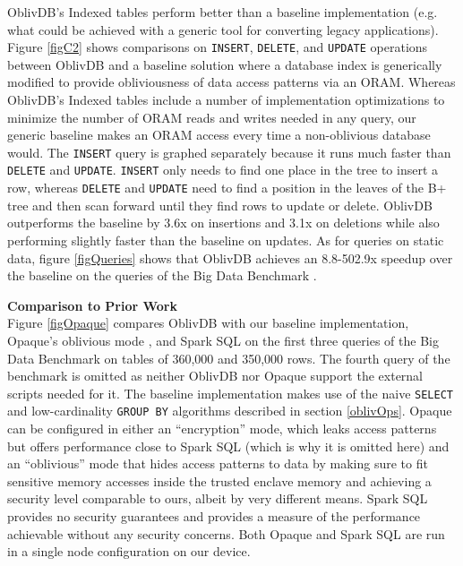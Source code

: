 \documentclass[conference]{IEEEtran}
\def\name/{OblivDB}
\begin{document}
\name/'s Indexed tables perform better than a baseline implementation (e.g. what could be achieved with a generic tool for converting legacy applications). Figure \ref{figC2} shows comparisons on \texttt{INSERT}, \texttt{DELETE}, and \texttt{UPDATE} operations between \name/ and a baseline solution where a database index is generically modified to provide obliviousness of data access patterns via an ORAM. Whereas \name/'s Indexed tables include a number of implementation optimizations to minimize the number of ORAM reads and writes needed in any query, our generic baseline makes an ORAM access every time a non-oblivious database would. The \texttt{INSERT} query is graphed separately because it runs much faster than \texttt{DELETE} and \texttt{UPDATE}. \texttt{INSERT} only needs to find one place in the tree to insert a row, whereas \texttt{DELETE} and \texttt{UPDATE} need to find a position in the leaves of the B+ tree and then scan forward until they find rows to update or delete. \name/ outperforms the baseline by 3.6x on insertions and 3.1x on deletions while also performing slightly faster than the baseline on updates. As for queries on static data, figure \ref{figQueries} shows that \name/ achieves an 8.8-502.9x speedup over the baseline on the queries of the Big Data Benchmark \cite{BDB}.

\medskip \noindent \textbf{Comparison to Prior Work}\\

Figure \ref{figOpaque} compares \name/ with our baseline implementation, Opaque's oblivious mode \cite{ZDB+17}, and Spark SQL \cite{SparkSQL} on the first three queries of the Big Data Benchmark \cite{BDB} on tables of 360,000 and 350,000 rows. The fourth query of the benchmark is omitted as neither \name/ nor Opaque support the external scripts needed for it. The baseline implementation makes use of the naive \texttt{SELECT} and low-cardinality \texttt{GROUP BY} algorithms described in section \ref{oblivOps}. Opaque can be configured in either an ``encryption'' mode, which leaks access patterns but offers performance close to Spark SQL (which is why it is omitted here) and an ``oblivious'' mode that hides access patterns to data by making sure to fit sensitive memory accesses inside the trusted enclave memory and achieving a security level comparable to ours, albeit by very different means. Spark SQL provides no security guarantees and provides a measure of the performance achievable without any security concerns. Both Opaque and Spark SQL are run in a single node configuration on our device. 
\end{document}
